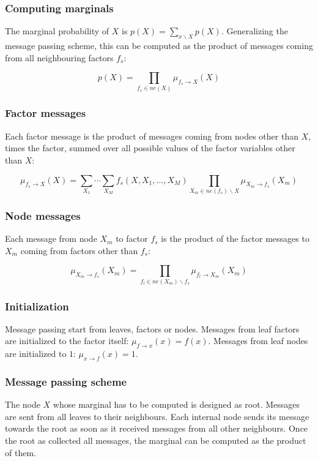		\subsubsection{Computing marginals}
		The marginal probability of $X$ is $p(X) = \sum\limits_{x\backslash X}p(X)$.
		Generalizing the message passing scheme, this can be computed as the product of messages coming from all neighbouring factors $f_s$:

		$$p(X) = \prod\limits_{f_s\in ne(X)}\mu_{f_s\rightarrow X}(X)$$

		\subsubsection{Factor messages}
		Each factor message is the product of messages coming from nodes other than $X$, times the factor, summed over all possible values of the factor variables other than $X$:

		$$\mu_{f_s\rightarrow X}(X) = \sum\limits_{X_1}\cdots\sum\limits_{X_M}f_s(X, X_1, \dots, X_M)\prod\limits_{X_m\in ne(f_s)\backslash X}\mu_{X_m\rightarrow f_s}(X_m)$$

		\subsubsection{Node messages}
		Each message from node $X_m$ to factor $f_s$ is the product of the factor messages to $X_m$ coming from factors other than $f_s$:

		$$\mu_{X_m\rightarrow f_s}(X_m) = \prod\limits_{f_l\in ne(X_m)\backslash f_s}\mu_{f_l\rightarrow X_m}(X_m)$$

		\subsubsection{Initialization}
		Message passing start from leaves, factors or nodes.
		Messages from leaf factors are initialized to the factor itself: $\mu_{f\rightarrow x}(x) = f(x)$.
		Messages from leaf nodes are initialized to $1$: $\mu_{x\rightarrow f}(x) = 1$.

		\subsubsection{Message passing scheme}
		The node $X$ whose marginal has to be computed is designed as root.
		Messages are sent from all leaves to their neighbours.
		Each internal node sends its message towards the root as soon as it received messages from all other neighbours.
		Once the root as collected all messages, the marginal can be computed as the product of them.

